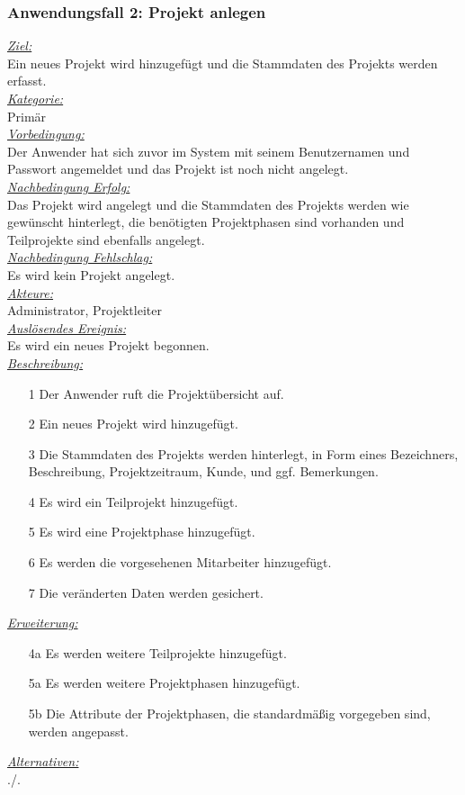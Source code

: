 \subsubsection{Anwendungsfall 2: Projekt anlegen}
\underline{\emph{Ziel:}}\\
Ein neues Projekt wird hinzugefügt und die Stammdaten des Projekts werden erfasst.\\
\underline{\emph{Kategorie:}} \\
Primär\\
\underline{\emph{Vorbedingung:}} \\
Der Anwender hat sich zuvor im System mit seinem Benutzernamen und Passwort angemeldet und das Projekt ist noch nicht angelegt.\\
\underline{\emph{Nachbedingung Erfolg:}} \\
Das Projekt wird angelegt und die Stammdaten des Projekts werden wie gewünscht hinterlegt, die benötigten Projektphasen sind vorhanden und Teilprojekte sind ebenfalls angelegt.\\
\underline{\emph{Nachbedingung Fehlschlag:}} \\
Es wird kein Projekt angelegt.\\
\underline{\emph{Akteure:}} \\
Administrator, Projektleiter\\
\underline{\emph{Auslösendes Ereignis:}} \\
Es wird ein neues Projekt begonnen.\\
\underline{\emph{Beschreibung:}}
\begin{itemize}
    \item [1] Der Anwender ruft die Projektübersicht auf.
    \item [2] Ein neues Projekt wird hinzugefügt.
    \item [3] Die Stammdaten des Projekts werden hinterlegt, in Form eines Bezeichners, Beschreibung, Projektzeitraum, Kunde, und ggf. Bemerkungen.
    \item [4] Es wird ein Teilprojekt hinzugefügt.
    \item [5] Es wird eine Projektphase hinzugefügt.
    \item [6] Es werden die vorgesehenen Mitarbeiter hinzugefügt.
    \item [7] Die veränderten Daten werden gesichert.
\end{itemize}
\underline{\emph{Erweiterung:}} \\
\begin{itemize}
    \item [4a] Es werden weitere Teilprojekte hinzugefügt. 
    \item [5a] Es werden weitere Projektphasen hinzugefügt.
    \item [5b] Die Attribute der Projektphasen, die standardmäßig vorgegeben sind, werden angepasst. 
\end{itemize}
\underline{\emph{Alternativen:}} \\
./.

